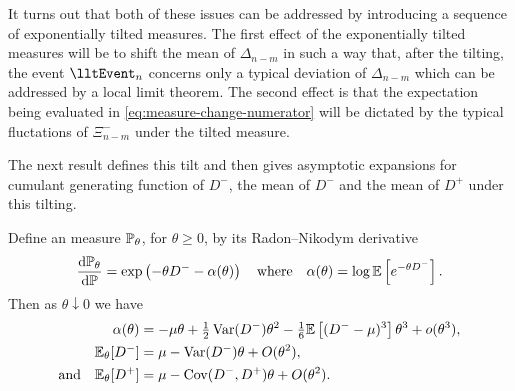 It turns out that both of these issues can be addressed by introducing a sequence of exponentially tilted measures.  The first effect of the exponentially tilted measures will be to shift the mean of $\Delta_{n-m}$ in such a way that, after the tilting, the event $\lltEvent_n$ concerns only a typical deviation of $\Delta_{n-m}$ which can be addressed by a local limit theorem. The second effect is that the expectation being evaluated in \cref{eq:measure-change-numerator} will be dictated by the typical fluctations of $\Xi^-_{n-m}$ under the tilted measure. 

The next result defines this tilt and then gives asymptotic expansions for cumulant generating function of $D^-$, the mean of $D^-$ and the mean of $D^+$ under this tilting. 
\begin{lemma}
    \label{lem:asym-expansions}
    Define an measure $\P_{\theta}$, for $\theta \geq 0$, by its Radon--Nikodym derivative
    \begin{equation*}
        \diff{\P_{\theta}}{\P} = \exp\left( - \theta D^- - \alpha(\theta) \right)
        \quad \text{where} \quad
        \alpha(\theta) = \log \E \left[ e^{-\theta D^-} \right].
    \end{equation*}
    Then as $\theta \downarrow 0$ we have
    \begin{align*}
        \alpha(\theta) &= -\mu \theta + \tfrac{1}{2}\var(D^-) \theta^2 - \tfrac{1}{6} \E \left[ (D^- - \mu)^3 \right] \theta^3 + \littleo(\theta^3), \\
        \E_{\theta}[D^-] &= \mu - \var(D^-) \theta + \bigo(\theta^2), \\
        \text{and} \quad \E_{\theta}[D^+] &= \mu - \cov(D^-, D^+) \theta + \bigo(\theta^2).
    \end{align*}
\end{lemma}
